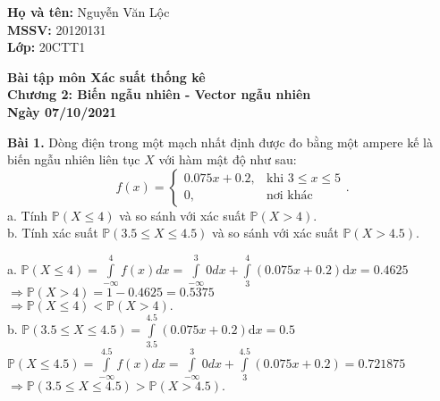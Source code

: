 \documentclass[12pt,a4paper]{article}
\author{Nguyễn Văn Lộc}
\begin{document}
    \fancyhf{}
    \lhead{}
    \chead{}
    \rhead{}
    \cfoot{}
    \rfoot{\thepage}
    \lfoot{}
    \pagestyle{fancy}
    \renewcommand{\headrulewidth}{0pt}
    \renewcommand{\footrulewidth}{0pt}
    \begin{mybox}
    \textbf{Họ và tên:} Nguyễn Văn Lộc\\
    \textbf{MSSV:} 20120131\\
    \textbf{Lớp:} 20CTT1
    \end{mybox}
    \begin{center}
    \fontsize{16}{14}\selectfont
    \textbf{Bài tập môn Xác suất thống kê}\\
    \textbf{Chương 2: Biến ngẫu nhiên - Vector ngẫu nhiên}\\
    \textbf{Ngày 07/10/2021}
    \end{center}
    \begin{mybox}
        \textbf{Bài 1.} Dòng điện trong một mạch nhất định được đo bằng một ampere kế là biến ngẫu nhiên liên tục $X$ với hàm mật độ như sau:
        $$f \left( x \right) = 
        \begin{cases}
            0.075x + 0.2, &\text{khi } 3 \leqslant x \leqslant 5\\
            0, &\text{nơi khác}
        \end{cases}
        .$$
    a. Tính $\mathbb{P} \left( {X \leqslant 4} \right)$ và so sánh với xác suất $\mathbb{P} \left( {X > 4} \right).$\\
    b. Tính xác suất $\mathbb{P} \left( {3.5 \leqslant X \leqslant 4.5} \right)$ và so sánh với xác suất $\mathbb{P} \left( {X > 4.5} \right).$
    \end{mybox}
    a. $\mathbb{P} \left( {X \leqslant 4} \right) = \int\limits_{ - \infty }^4 {f\left( x \right)dx}  = \int\limits_{ - \infty }^3 {0dx}  + \int\limits_3^4 {\left( {0.075x + 0.2} \right) \mathrm{d}x}  = 0.4625$\\
    $\Rightarrow \mathbb{P} \left( {X > 4} \right) = 1 - 0.4625 = 0.5375$\\
    $\Rightarrow \mathbb{P} \left( {X \leqslant 4} \right) < \mathbb{P} \left( {X > 4} \right).$\\
    b. $\mathbb{P} \left( {3.5 \leqslant X \leqslant 4.5} \right) = \int\limits_{3.5}^{4.5} {\left( {0.075x + 0.2} \right) \mathrm{d}x}  = 0.5$\\
    $\mathbb{P} \left( {X \leqslant 4.5} \right) = \int\limits_{ - \infty }^4.5 {f\left( x \right)dx}  = \int\limits_{ - \infty }^3 {0dx}  + \int\limits_3^4.5 {\left( {0.075x + 0.2} \right)}  = 0.721875$\\
    $\Rightarrow \mathbb{P} \left( {3.5 \leqslant X \leqslant 4.5} \right) >\mathbb{P} \left( {X > 4.5} \right).$ 
\end{document}
